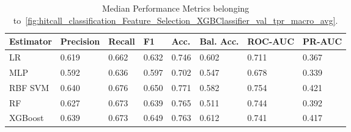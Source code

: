 \begin{longtable}{llllllll}
\caption{Median Performance Metrics belonging to~\ref{fig:hitcall_classification_Feature_Selection_XGBClassifier_val_tpr_macro_avg}.}\label{tab:table:hitcall_classification_feature_selection_xgbclassifier_val_tpr_macro_avg}\\
\toprule
\midrule
\small Estimator & \small Precision & \small Recall & \small F1 & \small Acc. & \small Bal. Acc. & \small ROC-AUC & \small PR-AUC\\
\hline
LR & 0.619 & 0.662 & 0.632 & 0.746 & 0.602 & 0.711 & 0.367\\
MLP & 0.592 & 0.636 & 0.597 & 0.702 & 0.547 & 0.678 & 0.339\\
RBF SVM & 0.640 & 0.676 & 0.650 & 0.771 & 0.582 & 0.754 & 0.421\\
RF & 0.627 & 0.673 & 0.639 & 0.765 & 0.511 & 0.744 & 0.392\\
XGBoost & 0.639 & 0.673 & 0.649 & 0.763 & 0.612 & 0.741 & 0.417\\
\bottomrule
\end{longtable}